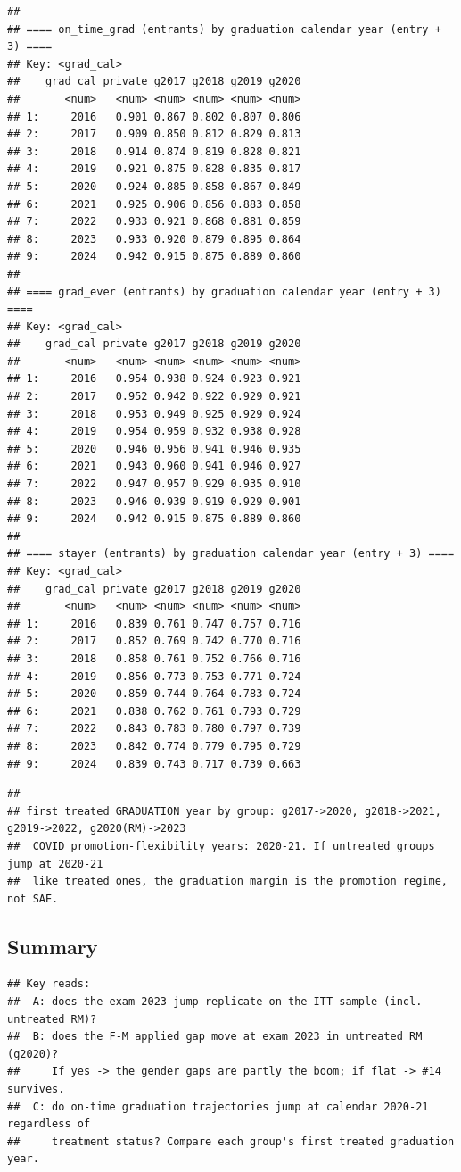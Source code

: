 \documentclass[
]{article}
\begin{document}
\begin{verbatim}
## 
## ==== on_time_grad (entrants) by graduation calendar year (entry + 3) ====
## Key: <grad_cal>
##    grad_cal private g2017 g2018 g2019 g2020
##       <num>   <num> <num> <num> <num> <num>
## 1:     2016   0.901 0.867 0.802 0.807 0.806
## 2:     2017   0.909 0.850 0.812 0.829 0.813
## 3:     2018   0.914 0.874 0.819 0.828 0.821
## 4:     2019   0.921 0.875 0.828 0.835 0.817
## 5:     2020   0.924 0.885 0.858 0.867 0.849
## 6:     2021   0.925 0.906 0.856 0.883 0.858
## 7:     2022   0.933 0.921 0.868 0.881 0.859
## 8:     2023   0.933 0.920 0.879 0.895 0.864
## 9:     2024   0.942 0.915 0.875 0.889 0.860
## 
## ==== grad_ever (entrants) by graduation calendar year (entry + 3) ====
## Key: <grad_cal>
##    grad_cal private g2017 g2018 g2019 g2020
##       <num>   <num> <num> <num> <num> <num>
## 1:     2016   0.954 0.938 0.924 0.923 0.921
## 2:     2017   0.952 0.942 0.922 0.929 0.921
## 3:     2018   0.953 0.949 0.925 0.929 0.924
## 4:     2019   0.954 0.959 0.932 0.938 0.928
## 5:     2020   0.946 0.956 0.941 0.946 0.935
## 6:     2021   0.943 0.960 0.941 0.946 0.927
## 7:     2022   0.947 0.957 0.929 0.935 0.910
## 8:     2023   0.946 0.939 0.919 0.929 0.901
## 9:     2024   0.942 0.915 0.875 0.889 0.860
## 
## ==== stayer (entrants) by graduation calendar year (entry + 3) ====
## Key: <grad_cal>
##    grad_cal private g2017 g2018 g2019 g2020
##       <num>   <num> <num> <num> <num> <num>
## 1:     2016   0.839 0.761 0.747 0.757 0.716
## 2:     2017   0.852 0.769 0.742 0.770 0.716
## 3:     2018   0.858 0.761 0.752 0.766 0.716
## 4:     2019   0.856 0.773 0.753 0.771 0.724
## 5:     2020   0.859 0.744 0.764 0.783 0.724
## 6:     2021   0.838 0.762 0.761 0.793 0.729
## 7:     2022   0.843 0.783 0.780 0.797 0.739
## 8:     2023   0.842 0.774 0.779 0.795 0.729
## 9:     2024   0.839 0.743 0.717 0.739 0.663
\end{verbatim}

\begin{verbatim}
## 
## first treated GRADUATION year by group: g2017->2020, g2018->2021, g2019->2022, g2020(RM)->2023
##  COVID promotion-flexibility years: 2020-21. If untreated groups jump at 2020-21
##  like treated ones, the graduation margin is the promotion regime, not SAE.
\end{verbatim}

\hypertarget{summary}{%
\subsection{Summary}\label{summary}}

\begin{verbatim}
## Key reads:
##  A: does the exam-2023 jump replicate on the ITT sample (incl. untreated RM)?
##  B: does the F-M applied gap move at exam 2023 in untreated RM (g2020)?
##     If yes -> the gender gaps are partly the boom; if flat -> #14 survives.
##  C: do on-time graduation trajectories jump at calendar 2020-21 regardless of
##     treatment status? Compare each group's first treated graduation year.
\end{verbatim}
\end{document}
